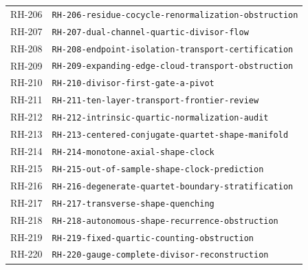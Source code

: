 \begin{longtable}{r >{\raggedright\arraybackslash}p{}}
RH-206 & \texttt{RH-\allowbreak{}206-\allowbreak{}residue-\allowbreak{}cocycle-\allowbreak{}renormalization-\allowbreak{}obstruction}\\
RH-207 & \texttt{RH-\allowbreak{}207-\allowbreak{}dual-\allowbreak{}channel-\allowbreak{}quartic-\allowbreak{}divisor-\allowbreak{}flow}\\
RH-208 & \texttt{RH-\allowbreak{}208-\allowbreak{}endpoint-\allowbreak{}isolation-\allowbreak{}transport-\allowbreak{}certification}\\
RH-209 & \texttt{RH-\allowbreak{}209-\allowbreak{}expanding-\allowbreak{}edge-\allowbreak{}cloud-\allowbreak{}transport-\allowbreak{}obstruction}\\
RH-210 & \texttt{RH-\allowbreak{}210-\allowbreak{}divisor-\allowbreak{}first-\allowbreak{}gate-\allowbreak{}a-\allowbreak{}pivot}\\
RH-211 & \texttt{RH-\allowbreak{}211-\allowbreak{}ten-\allowbreak{}layer-\allowbreak{}transport-\allowbreak{}frontier-\allowbreak{}review}\\
RH-212 & \texttt{RH-\allowbreak{}212-\allowbreak{}intrinsic-\allowbreak{}quartic-\allowbreak{}normalization-\allowbreak{}audit}\\
RH-213 & \texttt{RH-\allowbreak{}213-\allowbreak{}centered-\allowbreak{}conjugate-\allowbreak{}quartet-\allowbreak{}shape-\allowbreak{}manifold}\\
RH-214 & \texttt{RH-\allowbreak{}214-\allowbreak{}monotone-\allowbreak{}axial-\allowbreak{}shape-\allowbreak{}clock}\\
RH-215 & \texttt{RH-\allowbreak{}215-\allowbreak{}out-\allowbreak{}of-\allowbreak{}sample-\allowbreak{}shape-\allowbreak{}clock-\allowbreak{}prediction}\\
RH-216 & \texttt{RH-\allowbreak{}216-\allowbreak{}degenerate-\allowbreak{}quartet-\allowbreak{}boundary-\allowbreak{}stratification}\\
RH-217 & \texttt{RH-\allowbreak{}217-\allowbreak{}transverse-\allowbreak{}shape-\allowbreak{}quenching}\\
RH-218 & \texttt{RH-\allowbreak{}218-\allowbreak{}autonomous-\allowbreak{}shape-\allowbreak{}recurrence-\allowbreak{}obstruction}\\
RH-219 & \texttt{RH-\allowbreak{}219-\allowbreak{}fixed-\allowbreak{}quartic-\allowbreak{}counting-\allowbreak{}obstruction}\\
RH-220 & \texttt{RH-\allowbreak{}220-\allowbreak{}gauge-\allowbreak{}complete-\allowbreak{}divisor-\allowbreak{}reconstruction}\\

\end{longtable}
